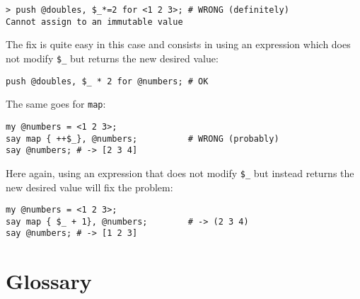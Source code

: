 \begin{enumerate}
\begin{verbatim}
> push @doubles, $_*=2 for <1 2 3>; # WRONG (definitely)
Cannot assign to an immutable value
\end{verbatim}

The fix is quite easy in this case and consists in 
using an expression which does not modify \verb'$_' 
but returns the new desired value:

\begin{verbatim}
push @doubles, $_ * 2 for @numbers; # OK
\end{verbatim}

The same goes for {\tt map}:

\begin{verbatim}
my @numbers = <1 2 3>;
say map { ++$_}, @numbers;          # WRONG (probably)
say @numbers; # -> [2 3 4]
\end{verbatim}
%

Here again, using an expression that does not modify \verb'$_' 
but instead returns the new desired value will fix the problem:

\begin{verbatim}
my @numbers = <1 2 3>;
say map { $_ + 1}, @numbers;        # -> (2 3 4)
say @numbers; # -> [1 2 3]
\end{verbatim}
%

\end{enumerate}



\section{Glossary}

